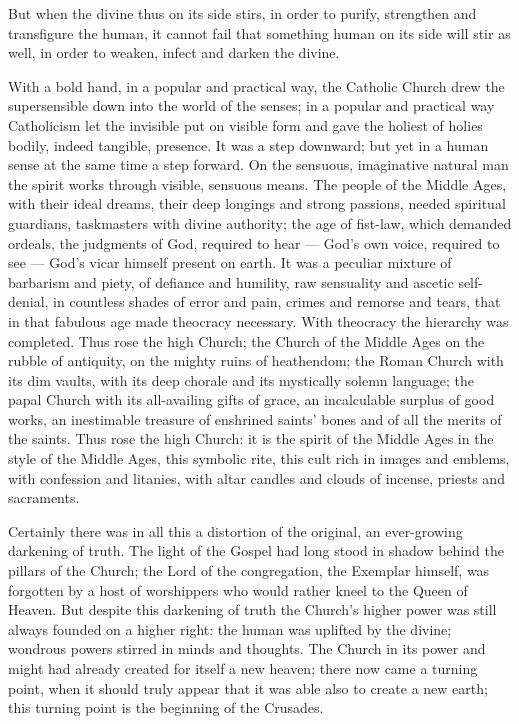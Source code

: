 \documentclass[12pt,a4paper,openany]{book}
\newcommand{\opage}[1]{\marginnote{\footnotesize\textit{[#1]}}}
\begin{document}
But when the divine thus on its side
stirs, in order to purify, strengthen and transfigure the human,
it cannot fail that something human on its side
will stir as well, in order to weaken, infect and darken the
divine.

With a bold hand, in a popular and practical way, the Catholic Church drew
the supersensible down into the world of the senses; in a popular and
practical way Catholicism let the invisible put on visible
form and gave the holiest of holies bodily, indeed tangible,
presence. It was a step downward; but yet in a human
sense at the same time a step forward. On the sensuous, imaginative
natural man the spirit works through visible, sensuous
means. The people of the Middle Ages, with their ideal dreams, their
deep longings and strong passions, needed spiritual
\opage{7}guardians, taskmasters with divine authority;
the age of fist-law, which demanded ordeals, the judgments of God, required to
hear --- God's own voice, required to see --- God's vicar
himself present on earth. It was a peculiar mixture of
barbarism and piety, of defiance and humility, raw sensuality and ascetic self-denial, in countless shades of
error and pain, crimes and remorse and tears,
that in that fabulous age made theocracy necessary.
With theocracy the hierarchy was completed. Thus rose the
high Church; the Church of the Middle Ages on the rubble of antiquity,
on the mighty ruins of heathendom; the Roman Church with its
dim vaults, with its deep chorale and its mystically
solemn language; the papal Church with its all-availing gifts of grace,
an incalculable surplus of good works, an
inestimable treasure of enshrined saints' bones and of all the
merits of the saints. Thus rose the high Church:
it is the spirit of the Middle Ages in the style of the Middle Ages, this
symbolic rite, this cult rich in images and emblems, with
confession and litanies, with altar candles and clouds of incense, priests
and sacraments.

Certainly there was in all this a distortion of the original,
an ever-growing darkening of truth. The light of the
Gospel had long stood in shadow behind the pillars of the Church; the Lord
of the congregation, the Exemplar himself, was forgotten by a host of worshippers
who would rather kneel to the Queen of Heaven. But
despite this darkening of truth the Church's higher
power was still always founded on a higher right: the human
was uplifted by the divine; wondrous powers
stirred in minds and thoughts. The Church in its power and might
had already created for itself a new heaven; there now came a
turning point, when it should truly appear that it was able also to create a new earth; this turning point is the beginning
of the Crusades.
\end{document}
